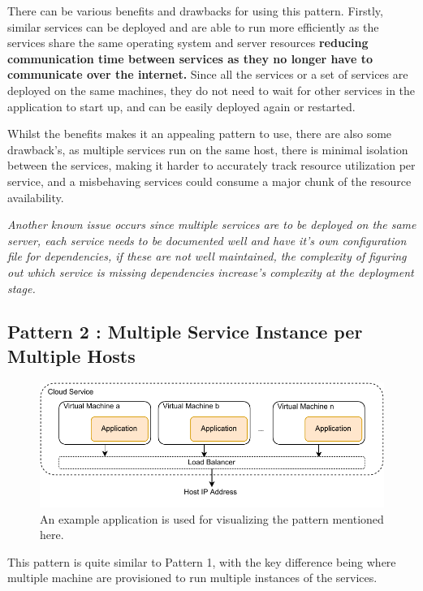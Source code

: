 There can be various benefits and drawbacks for using this pattern.  Firstly, similar services can be deployed and are able to run more efficiently as the services share the same operating system and server resources  \textbf{reducing communication time between services as they no longer have to communicate over the internet.} Since all the services or a set of services are deployed on the same machines, they do not need to wait for other services in the application to start up, and can be easily deployed again or restarted. 

Whilst the benefits makes it an appealing pattern to use, there are also some drawback's, as multiple services run on the same host, there is minimal isolation between the services, making it harder to accurately track resource utilization per service, and a misbehaving services could consume a major chunk of the resource availability. 

\textit{Another known issue occurs since multiple services are to be deployed on the same server, each service needs to be documented well and have it's own configuration file for dependencies, if these are not well maintained, the complexity of figuring out which service is missing dependencies increase's complexity at the deployment stage.  }



\subsection{Pattern 2 : Multiple Service Instance per Multiple Hosts}
    \begin{figure}[H]
        \centering
        \includegraphics[width=0.9\linewidth]{images/Pattern-2.pdf}
        \caption{An example application is used for visualizing the pattern mentioned here.}
    \end{figure}  

This pattern is quite similar to Pattern 1, with the key difference being where multiple machine are provisioned to run multiple instances of the services.   


